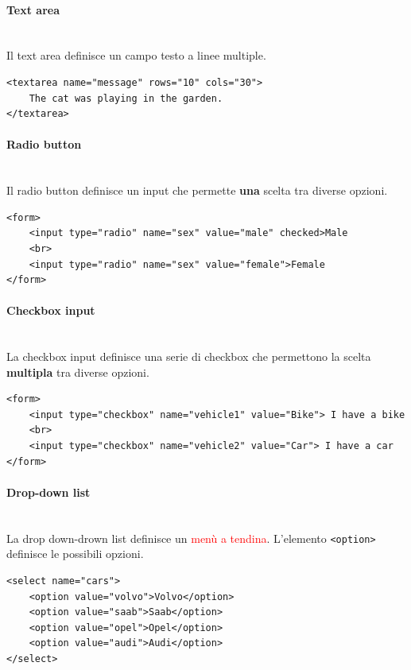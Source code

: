 \documentclass{article}
\begin{document}
\paragraph{Text area} \mbox{} \\
Il text area definisce un campo testo a linee multiple.
\begin{lstlisting}[style=htmlstyle]
<textarea name="message" rows="10" cols="30">
    The cat was playing in the garden.
</textarea>
\end{lstlisting}

\paragraph{Radio button} \mbox{} \\
Il radio button definisce un input che permette \textbf{una} scelta tra diverse opzioni.
\begin{lstlisting}[style=htmlstyle]
<form>
    <input type="radio" name="sex" value="male" checked>Male
    <br>
    <input type="radio" name="sex" value="female">Female
</form>
\end{lstlisting}
\paragraph{Checkbox input} \mbox{} \\
La checkbox input definisce una serie di checkbox che permettono la scelta \textbf{multipla} tra diverse opzioni.
\begin{lstlisting}[style=htmlstyle]
<form>
    <input type="checkbox" name="vehicle1" value="Bike"> I have a bike
    <br>
    <input type="checkbox" name="vehicle2" value="Car"> I have a car
</form>
\end{lstlisting}
\paragraph{Drop-down list} \mbox{} \\
La drop down-drown list definisce un \textcolor{red}{menù a tendina}. L'elemento \texttt{<option>} definisce le possibili opzioni.
\begin{lstlisting}[style=htmlstyle]
<select name="cars">
    <option value="volvo">Volvo</option>
    <option value="saab">Saab</option>
    <option value="opel">Opel</option>
    <option value="audi">Audi</option>
</select>
\end{lstlisting}
\pagebreak
\end{document}
